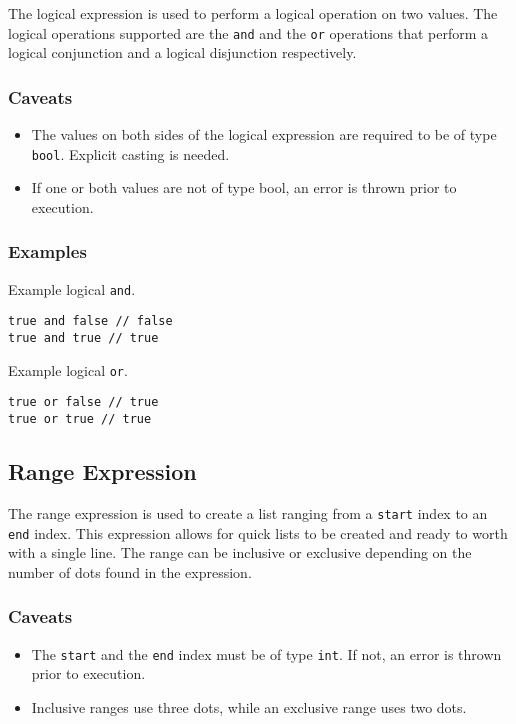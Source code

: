 The logical expression is used to perform a logical operation on two values. The logical operations supported are
the \texttt{and} and the \texttt{or} operations that perform a logical conjunction and a logical disjunction respectively.

\subsubsection{Caveats}

\begin{itemize}
    \item The values on both sides of the logical expression are required to be of type \texttt{bool}. Explicit casting is needed.
    \item If one or both values are not of type bool, an error is thrown prior to execution.
\end{itemize}

\subsubsection{Examples}

Example logical \texttt{and}.
\begin{verbatim}
true and false // false
true and true // true
\end{verbatim}
Example logical \texttt{or}.
\begin{verbatim}
true or false // true
true or true // true
\end{verbatim}

\subsection{Range Expression}

The range expression is used to create a list ranging from a \texttt{start} index to an \texttt{end} index.
This expression allows for quick lists to be created and ready to worth with a single line. The range can be
inclusive or exclusive depending on the number of dots found in the expression.

\subsubsection{Caveats}

\begin{itemize}
    \item The \texttt{start} and the \texttt{end} index must be of type \texttt{int}. If not, an error is thrown prior to execution.
    \item Inclusive ranges use three dots, while an exclusive range uses two dots.
\end{itemize}

